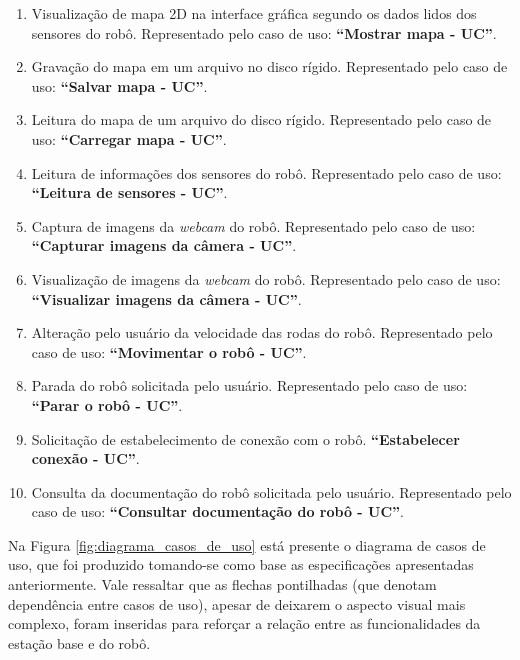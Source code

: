 \begin{enumerate}[topsep=0pt, partopsep=0pt, itemsep=0pt]
  \item Visualização de mapa 2D na interface gráfica segundo os dados lidos dos sensores do robô. Representado pelo caso de uso: \textbf{``Mostrar mapa - UC''}.
  \item Gravação do mapa em um arquivo no disco rígido. Representado pelo caso de uso: \textbf{``Salvar mapa - UC''}. 
  \item Leitura do mapa de um arquivo do disco rígido. Representado pelo caso de uso: \textbf{``Carregar mapa - UC''}.
  \item Leitura de informações dos sensores do robô. Representado pelo caso de uso: \textbf{``Leitura de sensores - UC''}.
  \item Captura de imagens da \textit{webcam} do robô. Representado pelo caso de uso: \textbf{``Capturar imagens da câmera - UC''}.
  \item Visualização de imagens da \textit{webcam} do robô. Representado pelo caso de uso: \textbf{``Visualizar imagens da câmera - UC''}.
  \item Alteração pelo usuário da velocidade das rodas do robô. Representado pelo caso de uso: \textbf{``Movimentar o robô - UC''}.
  \item Parada do robô solicitada pelo usuário. Representado pelo caso de uso: \textbf{``Parar o robô - UC''}.
  \item Solicitação de estabelecimento de conexão com o robô. \textbf{``Estabelecer conexão - UC''}.
  \item Consulta da documentação do robô solicitada pelo usuário. Representado pelo caso de uso: \textbf{``Consultar documentação do robô - UC''}.
\end{enumerate}

Na Figura \ref{fig:diagrama_casos_de_uso} está presente o diagrama de casos de uso, que foi produzido tomando-se como base as especificações apresentadas anteriormente. Vale ressaltar que as flechas pontilhadas (que denotam dependência entre casos de uso), apesar de deixarem o aspecto visual mais complexo, foram inseridas para reforçar a relação entre as funcionalidades da estação base e do robô.

